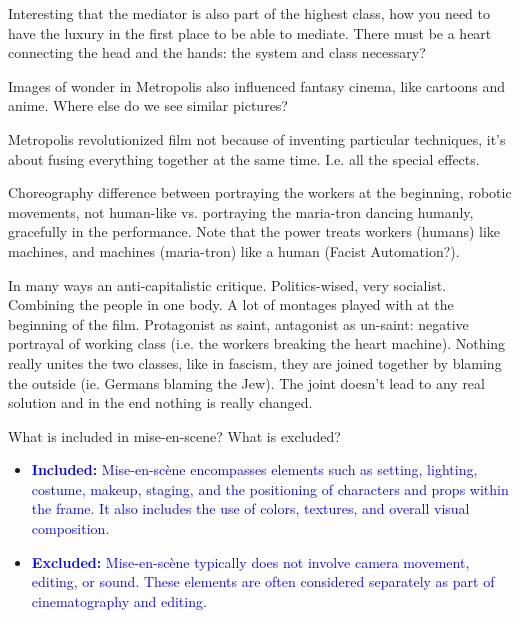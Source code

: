 \documentclass[11pt,fleqn]{book} %
\begin{document}
\begin{descriptions}
\begin{itemize}
\begin{itemize}
\begin{itemize}
            \end{itemize}
        \end{itemize}
    \end{itemize}
    \begin{remark}
        Interesting that the mediator is also part of the highest class, how you need to have the luxury in the first place to be able to mediate. There must be a heart connecting the head and the hands: the system and class necessary? 
    \end{remark}
    \begin{remark}
        Images of wonder in Metropolis also influenced fantasy cinema, like cartoons and anime. Where else do we see similar pictures?
    \end{remark}
    \begin{remark}
        Metropolis revolutionized film not because of inventing particular techniques, it's about fusing everything together at the same time. I.e. all the special effects.
    \end{remark}
    \begin{remark}
        Choreography difference between portraying the workers at the beginning, robotic movements, not human-like vs. portraying the maria-tron dancing humanly, gracefully in the performance. Note that the power treats workers (humans) like machines, and machines (maria-tron) like a human (Facist Automation?).
    \end{remark}
    \begin{remark}
        In many ways an anti-capitalistic critique. Politics-wised, very socialist. Combining the people in one body. A lot of montages played with at the beginning of the film. Protagonist as saint, antagonist as un-saint: negative portrayal of working class (i.e. the workers breaking the heart machine). Nothing really unites the two classes, like in fascism, they are joined together by blaming the outside (ie. Germans blaming the Jew). The joint doesn't lead to any real solution and in the end nothing is really changed.
    \end{remark}
\end{descriptions}

\begin{exercise}
    What is included in mise-en-scene? What is excluded?
    \begin{itemize}
        \item \textcolor{blue}{\textbf{Included:} Mise-en-scène encompasses elements such as setting, lighting, costume, makeup, staging, and the positioning of characters and props within the frame. It also includes the use of colors, textures, and overall visual composition.}
        \item \textcolor{blue}{\textbf{Excluded:} Mise-en-scène typically does not involve camera movement, editing, or sound. These elements are often considered separately as part of cinematography and editing.}
    \end{itemize}
\end{exercise}
\end{document}
